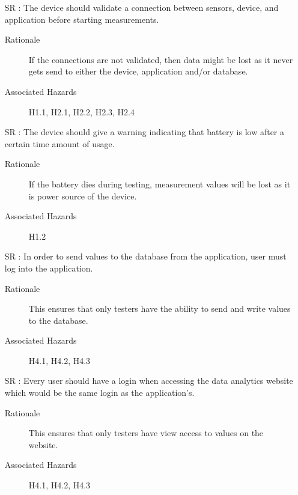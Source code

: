 \documentclass{article}
\newcounter{reqnum} %
\begin{document}
\begin{itemize}
  \item[SR \refstepcounter{reqnum}\thereqnum:] The device should validate a connection between sensors, device, and application before starting measurements.
    \begin{description} \item[Rationale] If the connections are not validated, then data might be lost as it never gets send to either the device, application and/or database.  \end{description}
    \begin{description} \item[Associated Hazards] H1.1, H2.1, H2.2, H2.3, H2.4  \end{description}
  
  \item[SR \refstepcounter{reqnum}\thereqnum:] The device should give a warning indicating that battery is low after a certain time amount of usage.
    \begin{description} \item[Rationale] If the battery dies during testing, measurement values will be lost as it is power source of the device.  \end{description}
    \begin{description} \item[Associated Hazards] H1.2  \end{description}
  
  \item[SR \refstepcounter{reqnum}\thereqnum:] In order to send values to the database from the application, user must log into the application.
    \begin{description} \item[Rationale] This ensures that only testers have the ability to send and write values to the database.   \end{description}
    \begin{description} \item[Associated Hazards] H4.1, H4.2, H4.3 \end{description}
    
  \item[SR \refstepcounter{reqnum}\thereqnum:] Every user should have a login when accessing the data analytics website which would be the same login as the application's.
    \begin{description} \item[Rationale] This ensures that only testers have view access to values on the website.   \end{description}
    \begin{description} \item[Associated Hazards] H4.1, H4.2, H4.3 \end{description}
  

\end{itemize}
\end{document}
